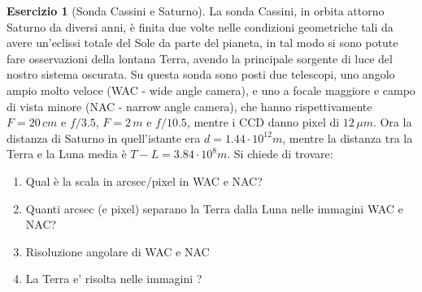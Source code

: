 \documentclass[a4paper,twoside,openany,notitlepage]{book}
\newcommand{\e}[1]{\cdot 10^{#1}}
\theoremstyle{definition}
\newtheorem{exrc}{Esercizio}
\theoremstyle{plain}
\begin{document}
\begin{exrc}[Sonda Cassini e Saturno]
	La sonda Cassini, in orbita attorno Saturno da diversi anni, è finita due volte nelle condizioni geometriche tali da avere un'eclissi totale del Sole da parte del pianeta, in tal modo si sono potute fare osservazioni della lontana Terra, avendo la principale sorgente di luce del nostro sistema oscurata. Su questa sonda sono posti due telescopi, uno angolo ampio molto veloce (WAC - wide angle camera), e uno a focale maggiore e campo di vista minore (NAC - narrow angle camera), che hanno rispettivamente $F=20\, cm$ e $f/3.5$, $F=2\, m$ e $f/10.5$, mentre i CCD danno pixel di $12\, \mu m$. Ora la distanza di Saturno in quell'istante era $d=1.44\e{12}m$, mentre la distanza tra la Terra e la Luna media è $T-L=3.84\e{8}m$. Si chiede di trovare:
	\begin{enumerate}
		\item Qual è la scala in arcsec/pixel in WAC e NAC?
		\item Quanti arcsec (e pixel) separano la Terra dalla Luna nelle immagini WAC e NAC?
		\item Risoluzione angolare di WAC e NAC
		\item La Terra e’ risolta nelle immagini ?
	\end{enumerate}
\end{exrc}
\end{document}
